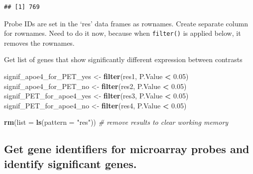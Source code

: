 \documentclass[]{article}
\newenvironment{Shaded}{\begin{snugshade}}{\end{snugshade}}
\newcommand{\KeywordTok}[1]{\textcolor[rgb]{0.13,0.29,0.53}{\textbf{#1}}}
\newcommand{\DataTypeTok}[1]{\textcolor[rgb]{0.13,0.29,0.53}{#1}}
\newcommand{\FloatTok}[1]{\textcolor[rgb]{0.00,0.00,0.81}{#1}}
\newcommand{\StringTok}[1]{\textcolor[rgb]{0.31,0.60,0.02}{#1}}
\newcommand{\CommentTok}[1]{\textcolor[rgb]{0.56,0.35,0.01}{\textit{#1}}}
\newcommand{\ControlFlowTok}[1]{\textcolor[rgb]{0.13,0.29,0.53}{\textbf{#1}}}
\newcommand{\OperatorTok}[1]{\textcolor[rgb]{0.81,0.36,0.00}{\textbf{#1}}}
\newcommand{\NormalTok}[1]{#1}
\begin{document}
\begin{verbatim}
## [1] 769
\end{verbatim}

Probe IDs are set in the `res' data frames as rownames. Create separate
column for rownames. Need to do it now, because when \texttt{filter()}
is applied below, it removes the rownames.

\begin{Shaded}
\end{Shaded}

Get list of genes that show significantly different expression between
contrasts

\begin{Shaded}
\begin{Highlighting}[]
\NormalTok{signif_apoe4_for_PET_yes <-}\StringTok{ }\KeywordTok{filter}\NormalTok{(res1, P.Value }\OperatorTok{<}\StringTok{ }\FloatTok{0.05}\NormalTok{)}
\NormalTok{signif_apoe4_for_PET_no <-}\StringTok{ }\KeywordTok{filter}\NormalTok{(res2, P.Value }\OperatorTok{<}\StringTok{ }\FloatTok{0.05}\NormalTok{)}
\NormalTok{signif_PET_for_apoe4_yes <-}\StringTok{ }\KeywordTok{filter}\NormalTok{(res3, P.Value }\OperatorTok{<}\StringTok{ }\FloatTok{0.05}\NormalTok{)}
\NormalTok{signif_PET_for_apoe4_no <-}\StringTok{ }\KeywordTok{filter}\NormalTok{(res4, P.Value }\OperatorTok{<}\StringTok{ }\FloatTok{0.05}\NormalTok{)}

\KeywordTok{rm}\NormalTok{(}\DataTypeTok{list =} \KeywordTok{ls}\NormalTok{(}\DataTypeTok{pattern =} \StringTok{"res"}\NormalTok{)) }\CommentTok{# remove results to clear working memory}
\end{Highlighting}
\end{Shaded}

\subsection{Get gene identifiers for microarray probes and identify
significant
genes.}\label{get-gene-identifiers-for-microarray-probes-and-identify-significant-genes.}
\end{document}
